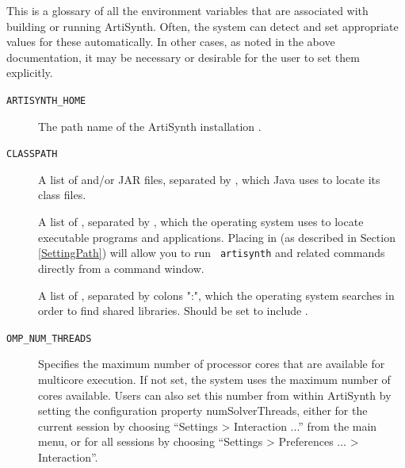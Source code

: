 This is a glossary of all the environment variables that are
associated with building or running ArtiSynth. Often, the system can
detect and set appropriate values for these automatically. In other
cases, as noted in the above documentation, it may be necessary or
desirable for the user to set them explicitly.

\begin{description}

\item[{\tt ARTISYNTH\_HOME}]\mbox{}
 
The path name of the ArtiSynth installation \directory{}.

%

\item[{\tt CLASSPATH}]\mbox{}

A list of \directories{} and/or JAR files, separated by
\separatorDesc, which Java uses to locate its class files.

\item[\PATH{}]\mbox{}
 
A list of \directories{}, separated by \separatorDesc, which the
operating system uses to locate executable programs and
applications. Placing  in \PATH{} (as
described in Section \ref{SettingPath}) will allow you to run {\tt
artisynth} and related commands directly from a command window.

\ifNeedLibraryPath
\ifWindows\else %
\item[\LIBRARYPATH{}]\mbox{}

A list of \directories{}, separated by colons
":", which the operating system searches in order to find shared libraries.
Should be set to include .
\fi %
\fi %

\item[{\tt OMP\_NUM\_THREADS}]\mbox{}
 
Specifies the maximum number of processor cores that are available for
multicore execution. If not set, the system uses the
maximum number of cores available. Users can also set this number from
within ArtiSynth by setting the configuration property {\sf
numSolverThreads}, either for the current session by choosing {\sf
``Settings > Interaction ...''} from the main menu, or for all sessions by
choosing {\sf ``Settings > Preferences ... > Interaction''}.

\end{description}

